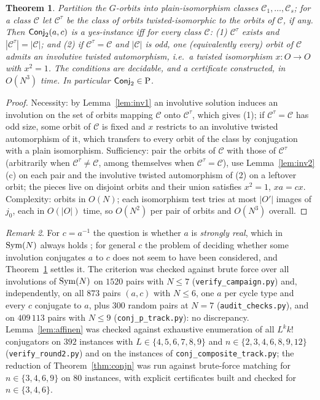 \documentclass[preprint,12pt]{elsarticle}
\newtheorem{thm}{Theorem}[section]\newtheorem{lem}[thm]{Lemma}\newtheorem{cor}[thm]{Corollary}\newtheorem{prop}[thm]{Proposition}
\theoremstyle{definition}\newtheorem{defi}[thm]{Definition}\newtheorem{prob}[thm]{Problem}\newtheorem{obs}[thm]{Observation}
\theoremstyle{remark}\newtheorem{rem}[thm]{Remark}
\begin{document}
\begin{thm}\label{thm:conj2}
Partition the $G$-orbits into plain-isomorphism classes $\mathcal C_1,\dots,\mathcal C_s$; for a class $\mathcal C$ let $\mathcal C^{\tau}$ be the
class of orbits twisted-isomorphic to the orbits of $\mathcal C$, if any. Then $\mathsf{Conj}_{2}(a,c)$ is a yes-instance iff for every class
$\mathcal C$: (1) $\mathcal C^{\tau}$ exists and $|\mathcal C^{\tau}|=|\mathcal C|$; and (2) if $\mathcal C^{\tau}=\mathcal C$ and $|\mathcal C|$ is odd,
one (equivalently every) orbit of $\mathcal C$ admits an involutive twisted automorphism, i.e.\ a twisted isomorphism $x\colon O\to O$ with $x^{2}=1$. The conditions are decidable, and a certificate
constructed, in $O(N^{3})$ time. In particular $\mathsf{Conj}_{2}\in\mathrm P$.
\end{thm}
\begin{proof}
Necessity: by Lemma~\ref{lem:inv1} an involutive solution induces an involution on the set of orbits mapping $\mathcal C$ onto $\mathcal C^{\tau}$,
which gives (1); if $\mathcal C^{\tau}=\mathcal C$ has odd size, some orbit of $\mathcal C$ is fixed and $x$ restricts to an involutive twisted
automorphism of it, which transfers to every orbit of the class by conjugation with a plain isomorphism. Sufficiency: pair the orbits of
$\mathcal C$ with those of $\mathcal C^{\tau}$ (arbitrarily when $\mathcal C^{\tau}\ne\mathcal C$, among themselves when $\mathcal C^{\tau}=\mathcal C$),
use Lemma~\ref{lem:inv2}(c) on each pair and the involutive twisted automorphism of (2) on a leftover orbit; the pieces live on disjoint orbits
and their union satisfies $x^{2}=1$, $xa=cx$. Complexity: orbits in $O(N)$; each isomorphism test tries at most $|O'|$ images of $j_0$, each in
$O(|O|)$ time, so $O(N^{2})$ per pair of orbits and $O(N^{3})$ overall.
\end{proof}
\begin{rem}
For $c=a^{-1}$ the question is whether $a$ is \emph{strongly real}, which in $\operatorname{Sym}(N)$ always holds \cite{tiep2005real}; for general $c$
the problem of deciding whether some involution conjugates $a$ to $c$ does not seem to have been considered, and Theorem~\ref{thm:conj2}
settles it. The criterion was checked against brute force over all involutions of $\operatorname{Sym}(N)$ on $1520$ pairs with $N\le7$
(\texttt{verify\_campaign.py}) and, independently, on all $873$ pairs $(a,c)$ with $N\le6$, one $a$ per cycle type and every $c$ conjugate
to $a$, plus $300$ random pairs at $N=7$ (\texttt{audit\_checks.py}), and on $409\,113$ pairs with $N\le9$ (\texttt{conj\_p\_track.py}):
no discrepancy. Lemma~\ref{lem:affinen} was checked against exhaustive enumeration of all $L^{k}k!$ conjugators on $392$ instances with
$L\in\{4,5,6,7,8,9\}$ and $n\in\{2,3,4,6,8,9,12\}$ (\texttt{verify\_round2.py}) and on the instances of \texttt{conj\_composite\_track.py};
the reduction of Theorem~\ref{thm:conjn} was run against brute-force matching for $n\in\{3,4,6,9\}$ on $80$ instances, with explicit
certificates built and checked for $n\in\{3,4,6\}$.
\end{rem}
\end{document}
